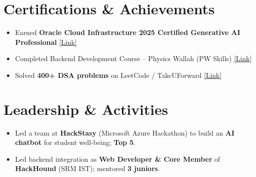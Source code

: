 \documentclass[a4paper,10pt]{article}
\newcommand{\resumeItem}[1]{
  \item\small{{#1 \vspace{-2pt}}}
}
\newcommand{\resumeItemListStart}{\begin{itemize}[leftmargin=0.2in]}
\newcommand{\resumeItemListEnd}{\end{itemize}\vspace{-4pt}}
\begin{document}
\section{Certifications \& Achievements}
  \resumeItemListStart
    \resumeItem{Earned \textbf{Oracle Cloud Infrastructure 2025 Certified Generative AI Professional} \href{https://catalog-education.oracle.com/pls/certview/sharebadge?id=D1697C217E86DB7066CA74B71878189E83443397D52319E28D755FB68BBC4DCE}{\underline{[Link]}}}
    \resumeItem{Completed Backend Development Course -- Physics Wallah (PW Skills) \href{https://pwskills.com/learn/certificate/c4ace320-e0d1-4858-ba31-304f4e119866/}{\underline{[Link]}}}
    \resumeItem{Solved \textbf{400+ DSA problems} on LeetCode / TakeUForward \href{https://takeuforward.org/profile/deepanshuguptacode}{\underline{[Link]}}}
  \resumeItemListEnd

\section{Leadership \& Activities}
  \resumeItemListStart
    \resumeItem{Led a team at \textbf{HackStasy} (Microsoft Azure Hackathon) to build an \textbf{AI chatbot} for student well-being; \textbf{Top 5}.}
    \resumeItem{Led backend integration as \textbf{Web Developer \& Core Member} of \textbf{HackHound} (SRM IST); mentored \textbf{3 juniors}.}
  \resumeItemListEnd
\end{document}
